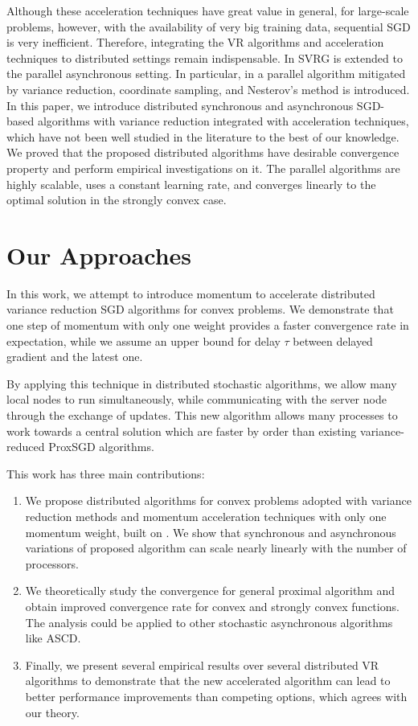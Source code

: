 \documentclass[conference]{IEEEtran}
\theoremstyle{definition}
\theoremstyle{remark}
\begin{document}
Although these acceleration techniques have great value in general, for large-scale problems, however, with the availability of very big training data, sequential SGD is very inefficient. Therefore, integrating the VR algorithms and acceleration techniques to distributed settings remain indispensable. In \cite{Mania2017, Reddi2015} SVRG is extended to the parallel asynchronous setting. In particular, in \cite{Meng2016} a parallel algorithm mitigated by variance reduction, coordinate sampling, and Nesterov’s method is introduced. In this paper, we introduce distributed synchronous and asynchronous SGD-based algorithms with variance reduction integrated with acceleration techniques, which have not been well studied in the literature to the best of our knowledge. We proved that the proposed distributed algorithms have desirable convergence property and perform empirical investigations on it. The parallel algorithms are highly scalable, uses a constant learning rate, and converges linearly to the optimal solution in the strongly convex case.

\section{Our Approaches}
In this work, we attempt to introduce momentum to accelerate distributed variance reduction SGD algorithms for convex problems. We demonstrate that one step of momentum with only one weight provides a faster convergence rate in expectation, while we assume an upper bound for delay $\tau$ between delayed gradient and the latest one. 

By applying this technique in distributed stochastic algorithms, we allow many local nodes to run simultaneously, while communicating 
with the server node through the exchange of updates. This new algorithm allows many processes to work towards a central solution which are
faster by order than existing variance-reduced ProxSGD algorithms. 

This work has three main contributions:

\begin{enumerate}
    
\item We propose distributed algorithms for convex problems adopted with variance reduction methods and momentum acceleration techniques with only one momentum weight, built on \cite{Allen-Zhu17,Meng2016,shang2018guaranteed}. We show that synchronous and asynchronous variations of proposed algorithm can scale  nearly linearly with the number of processors. 

\item We theoretically study the convergence for general proximal algorithm and obtain improved convergence rate for convex and strongly convex functions.
The analysis could be applied to other stochastic asynchronous algorithms like ASCD.
 
\item Finally, we present several empirical results over several distributed VR algorithms to demonstrate that the new accelerated algorithm 
can lead to better performance improvements than competing options, which agrees with our theory.
\end{enumerate}
\end{document}
